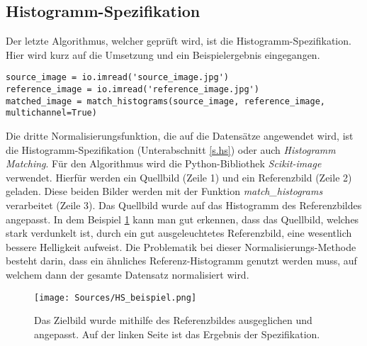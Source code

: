 \subsection{Histogramm-Spezifikation}
Der letzte Algorithmus, welcher geprüft wird, ist die Histogramm-Spezifikation. Hier wird kurz auf die Umsetzung und ein Beispielergebnis eingegangen.\\
\begin{lstlisting}
source_image = io.imread('source_image.jpg')
reference_image = io.imread('reference_image.jpg')
matched_image = match_histograms(source_image, reference_image, multichannel=True)
\end{lstlisting}
Die dritte Normalisierungsfunktion, die auf die Datensätze angewendet wird, ist die Histogramm-Spezifikation (Unterabschnitt \ref{s.hs}) oder auch \textit{Histogramm Matching}. Für den Algorithmus wird die Python-Bibliothek \textit{Scikit-image} verwendet. Hierfür werden ein Quellbild (Zeile 1) und ein Referenzbild (Zeile 2) geladen. Diese beiden Bilder werden mit der Funktion \textit{match\_histograms} verarbeitet (Zeile 3). Das Quellbild wurde auf das Histogramm des Referenzbildes angepasst. In dem Beispiel \ref{img:histogramspez} kann man gut erkennen, dass das Quellbild, welches stark verdunkelt ist, durch ein gut ausgeleuchtetes Referenzbild, eine wesentlich bessere Helligkeit aufweist. Die Problematik bei dieser Normalisierungs-Methode besteht darin, dass ein ähnliches Referenz-Histogramm genutzt werden muss, auf welchem dann der gesamte Datensatz normalisiert wird.
\begin{figure}
	[h]
	\centering
	\texttt{[image: Sources/HS\_beispiel.png]}
	\caption{Das Zielbild wurde mithilfe des Referenzbildes ausgeglichen und angepasst. Auf der linken Seite ist das Ergebnis der Spezifikation.}
	\label{img:histogramspez}
\end{figure}